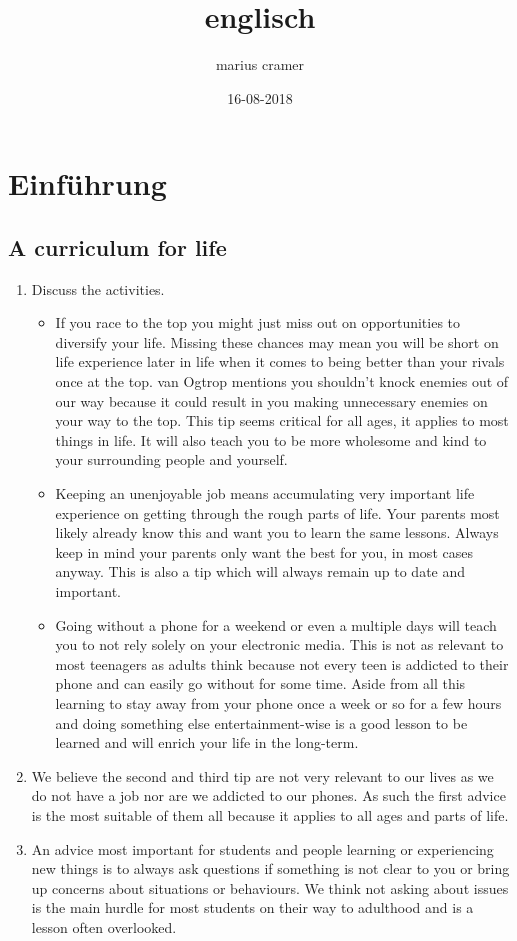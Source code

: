 \documentclass{article}
\title{englisch}
\author{marius cramer}
\date{16-08-2018}
\begin{document}
\maketitle

\section{\textbf{Einführung}}
\subsection{A curriculum for life}
\begin{enumerate}
  \item Discuss the activities.
  \begin{itemize}
    \item If you race to the top you might just miss out on opportunities to diversify your life. Missing these chances may mean you will be short on life experience later in life when it comes to being better than your rivals once at the top. van Ogtrop mentions you shouldn't knock enemies out of our way because it could result in you making unnecessary enemies on your way to the top. This tip seems critical for all ages, it applies to most things in life. It will also teach you to be more wholesome and kind to your surrounding people and yourself.
    \item Keeping an unenjoyable job means accumulating very important life experience on getting through the rough parts of life. Your parents most likely already know this and want you to learn the same lessons. Always keep in mind your parents only want the best for you, in most cases anyway. This is also a tip which will always remain up to date and important.
    \item Going without a phone for a weekend or even a multiple days will teach you to not rely solely on your electronic media. This is not as relevant to most teenagers as adults think because not every teen is addicted to their phone and can easily go without for some time. Aside from all this learning to stay away from your phone once a week or so for a few hours and doing something else entertainment-wise is a good lesson to be learned and will enrich your life in the long-term.
  \end{itemize}
  \item We believe the second and third tip are not very relevant to our lives as we do not have a job nor are we addicted to our phones. As such the first advice is the most suitable of them all because it applies to all ages and parts of life.
  \item An advice most important for students and people learning or experiencing new things is to always ask questions if something is not clear to you or bring up concerns about situations or behaviours. We think not asking about issues is the main hurdle for most students on their way to adulthood and is a lesson often overlooked.
\end{enumerate}
\end{document}
